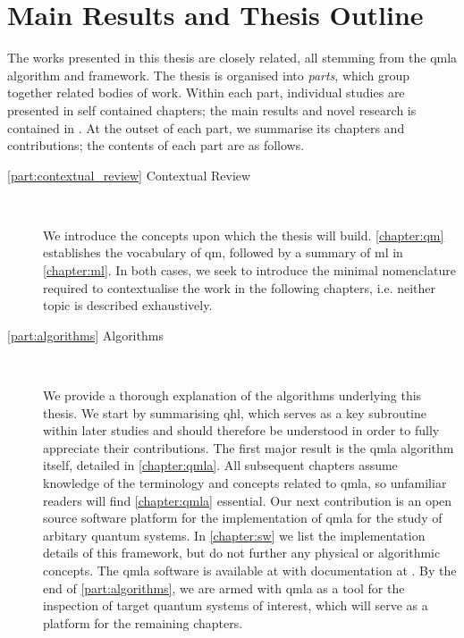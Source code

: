 \section{Main Results and Thesis Outline}

The works presented in this thesis are closely related, 
    all stemming from the \gls{qmla} algorithm and framework. 
The thesis is organised into \emph{parts}, 
    which group together related bodies of work. 
Within each part, individual studies are presented in self contained chapters;
    the main results and novel research is contained in .  
At the outset of each part, we summarise its chapters and contributions;
    the contents of each part are as follows. 

\begin{description}
    \item[\cref{part:contextual_review} Contextual Review] \
    
        We introduce the concepts upon which the thesis will build. 
        \cref{chapter:qm} establishes the vocabulary of \gls{qm}, 
            followed by a summary of \gls{ml} in \cref{chapter:ml}. 
        In both cases, we seek to introduce the minimal nomenclature required to 
            contextualise the work in the following chapters, 
            i.e. neither topic is described exhaustively. 
    
    \item[\cref{part:algorithms} Algorithms] \
    
        We provide a thorough explanation of the algorithms underlying this thesis. 
        We start by summarising \gls{qhl}, which serves as a key subroutine within later studies and should therefore 
            be understood in order to fully appreciate their contributions. 
        The first major result is the \gls{qmla} algorithm itself, 
            detailed in \cref{chapter:qmla}. 
        All subsequent chapters assume knowledge of the terminology and concepts related to \gls{qmla}, 
            so unfamiliar readers will find \cref{chapter:qmla} essential. 
        Our next contribution is an open source software platform for the implementation of \gls{qmla} 
            for the study of arbitary quantum systems.
        In \cref{chapter:sw} we list the implementation details of this framework, 
            but do not further any physical or algorithmic concepts. 
        The \gls{qmla} software is available at \cite{flynn2021QMLA} with documentation at \cite{qmla_docs}.
        By the end of \cref{part:algorithms}, 
            we are armed with \gls{qmla} as a tool for the inspection of target quantum systems of interest,
            which will serve as a platform for the remaining chapters.
        

\end{description}
